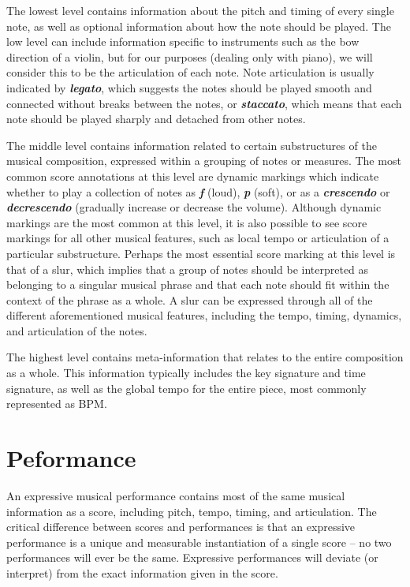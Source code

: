 \newcommand{\mnot}[1]{\textbf{\emph{#1}}}

The lowest level contains information about the pitch and timing of every single note, as well as optional information about how the note should be played. The low level can include information specific to instruments such as the bow direction of a violin, but for our purposes (dealing only with piano), we will consider this to be the articulation of each note. Note articulation is usually indicated by \mnot{legato}, which suggests the notes should be played smooth and connected without breaks between the notes, or \mnot{staccato}, which means that each note should be played sharply and detached from other notes. 

The middle level contains information related to certain substructures of the musical composition, expressed within a grouping of notes or measures. The most common score annotations at this level are dynamic markings which indicate whether to play a collection of notes as \mnot{f} (loud), \mnot{p} (soft), or as a \mnot{crescendo} or \mnot{decrescendo} (gradually increase or decrease the volume). %
Although dynamic markings are the most common at this level, it is also possible to see score markings for all other musical features, such as local tempo or articulation of a particular substructure. Perhaps the most essential score marking at this level is that of a slur, which implies that a group of notes should be interpreted as belonging to a singular musical phrase and that each note should fit within the context of the phrase as a whole. A slur can be expressed through all of the different aforementioned musical features, including the tempo, timing, dynamics, and articulation of the notes.

The highest level contains meta-information that relates to the entire composition as a whole. This information typically includes the key signature and time signature, as well as the global tempo for the entire piece, most commonly represented as BPM. 


\section{Peformance}\label{sec:performance}
An expressive musical performance contains most of the same musical information as a score, including pitch, tempo, timing, and articulation. The critical difference between scores and performances is that an expressive performance is a unique and measurable instantiation of a single score -- no two performances will ever be the same. Expressive performances will deviate (or interpret) from the exact information given in the score. 

